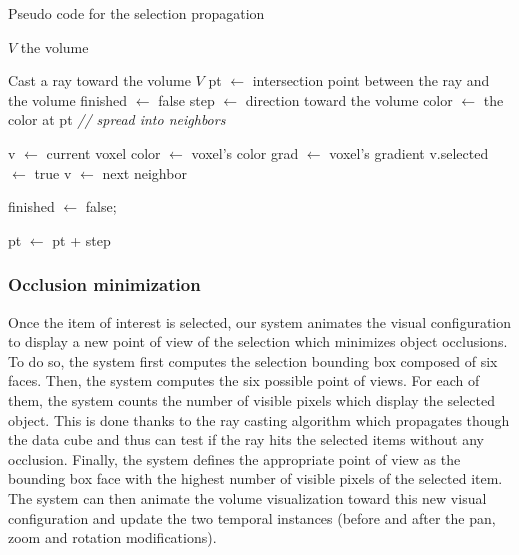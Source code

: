 \begin{algorithm} \caption{Pseudo code for the selection propagation} 
\label{alg:propagation}
\begin{algorithmic}[1]
\Require $V$ the volume

\State Cast a ray toward the volume $V$  
\State  pt $\leftarrow$ intersection point between the ray and the volume \;
\State  finished $\leftarrow$ false \;
 	\State step $\leftarrow$ direction toward the volume \;
  	\State color $\leftarrow$ the color at pt \;
	\State \emph{// spread into neighbors}
    
    \State v $\leftarrow$ current voxel \;
    	\State color $\leftarrow$ voxel's color \;
        \State grad $\leftarrow$ voxel's gradient\;
         \State 	v.selected $\leftarrow$ true \;
         \EndIf
        \State  v $\leftarrow$ next neighbor \;
    \EndWhile    

    \State finished $\leftarrow$ false;
    
  \EndIf
 \State  pt $\leftarrow$ pt + step \;
\EndWhile
 
\EndIf

\end{algorithmic}
\end{algorithm}




\subsubsection{Occlusion minimization}

Once the item of interest is selected, our system animates the visual configuration to display a new point of view of the selection which minimizes object occlusions. To do so, the system first computes the selection bounding box composed of six faces. Then, the system computes the six possible point of views. For each of them, the system counts the number of visible pixels which display the selected object. This is done thanks to the ray casting algorithm which propagates though the data cube and thus can test if the ray hits the selected items without any occlusion. Finally, the system defines the appropriate point of view as the bounding box face with the highest number of visible pixels of the selected item.
The system can then animate the volume visualization toward this new visual configuration and update the two temporal instances (before and after the pan, zoom and rotation modifications).

